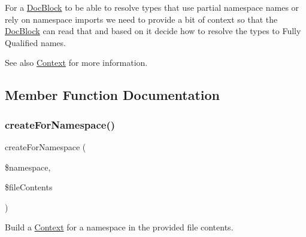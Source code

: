For a \mbox{\hyperlink{classphp_documentor_1_1_reflection_1_1_doc_block}{Doc\+Block}} to be able to resolve types that use partial namespace names or rely on namespace imports we need to provide a bit of context so that the \mbox{\hyperlink{classphp_documentor_1_1_reflection_1_1_doc_block}{Doc\+Block}} can read that and based on it decide how to resolve the types to Fully Qualified names.

\begin{DoxySeeAlso}{See also}
\mbox{\hyperlink{classphp_documentor_1_1_reflection_1_1_types_1_1_context}{Context}} for more information. 
\end{DoxySeeAlso}


\subsection{Member Function Documentation}
\mbox{\label{classphp_documentor_1_1_reflection_1_1_types_1_1_context_factory_ac92207472f938f572b9a9503659ea4c7}} 
\subsubsection{\texorpdfstring{create\+For\+Namespace()}{createForNamespace()}}
{\footnotesize\ttfamily create\+For\+Namespace (\begin{DoxyParamCaption}\item[{}]{\$namespace,  }\item[{}]{\$file\+Contents }\end{DoxyParamCaption})}

Build a \mbox{\hyperlink{classphp_documentor_1_1_reflection_1_1_types_1_1_context}{Context}} for a namespace in the provided file contents.


